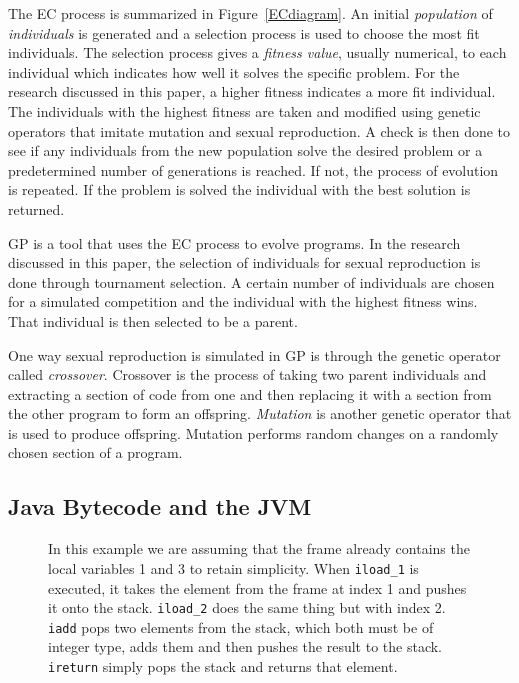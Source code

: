 \documentclass{sig-alternate}
\begin{document}
The EC process is summarized in Figure~\ref{ECdiagram}. An initial \textit{population} of \textit{individuals} is generated and a selection process is used to choose the most fit individuals. The selection process gives a \textit{fitness value}, usually numerical, to each individual which indicates how well it solves the specific problem. For the research discussed in this paper, a higher fitness indicates a more fit individual. The individuals with the highest fitness are taken and modified using genetic operators that imitate mutation and sexual reproduction. A check is then done to see if any individuals from the new population solve the desired problem or a predetermined number of generations is reached. If not, the process of evolution is repeated.  If the problem is solved the individual with the best solution is returned.\par

	GP is a tool that uses the EC process to evolve programs. In the research discussed in this paper, the selection of individuals for sexual reproduction is done through tournament selection. A certain number of individuals are chosen for a simulated competition and the individual with the highest fitness wins. That individual is then selected to be a parent.\par 
		
	One way sexual reproduction is simulated in GP is through the genetic operator called \textit{crossover}. Crossover is the process of taking two parent individuals and extracting a section of code from one and then replacing it with a section from the other program to form an offspring. \textit{Mutation} is another genetic operator that is used to produce offspring. Mutation performs random changes on a randomly chosen section of a program.


\subsection{Java Bytecode and the JVM}

\begin{figure}
\centering
{}

\caption{In this example we are assuming that the frame already contains the local variables 1 and 3 to retain simplicity. When \texttt{iload\_1} is executed, it takes the element from the frame at index 1 and pushes it onto the stack. \texttt{iload\_2} does the same thing but with index 2. \texttt{iadd} pops two elements from the stack, which both must be of integer type, adds them and then pushes the result to the stack. \texttt{ireturn} simply pops the stack and returns that element.}
\label{stack}
\end{figure}
\end{document}
